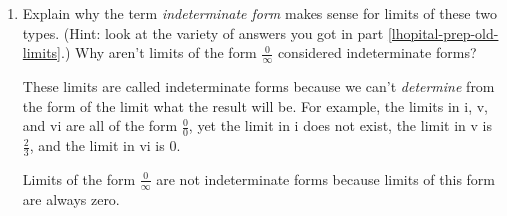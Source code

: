 \documentclass{article}
\begin{document}
\begin{enumerate}
\begin{enumerate}
  \item
    \begin{problem}[\vfill]
      Explain why the term \emph{indeterminate form} makes sense for
      limits of these two types. (Hint: look at the variety of answers you
      got in part \ref{lhopital-prep-old-limits}.) Why aren't limits of
      the form $\frac{0}{\infty}$ considered indeterminate forms?
    \end{problem}

    \begin{solution}
      These limits are called indeterminate forms because we can't
      \emph{determine} from the form of the limit what the result will
      be. For example, the limits in i, v, and vi are all of the form
      $\frac{0}{0}$, yet the limit in i does not exist, the limit in v is
      $\frac{2}{3}$, and the limit in vi is 0.

      Limits of the form $\frac{0}{\infty}$ are not indeterminate forms
      because limits of this form are always zero.
    \end{solution}
  \end{enumerate}

\end{enumerate}

\end{document}
